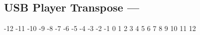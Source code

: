 \subsection[USB Player Transpose]{USB Player Transpose --- \UiKey{\SET}}





























-12
-11
-10
-9
-8
-7
-6
-5
-4
-3
-2
-1
0
1
2
3
4
5
6
7
8
9
10
11
12
